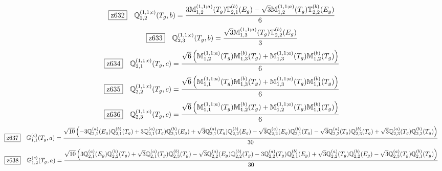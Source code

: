 \documentclass[fleqn,10pt,landscape]{jsarticle}
\begin{document}
\begin{dmath*}
\hspace*{3mm}\fbox{z632}\quad \mathbb{Q}_{2,2}^{(1,1;c)}(T_{g},b)=\frac{3 \mathbb{M}_{1,2}^{(1,1;a)}(T_{g}) \mathbb{T}_{2,1}^{(b)}(E_{g}) - \sqrt{3} \mathbb{M}_{1,2}^{(1,1;a)}(T_{g}) \mathbb{T}_{2,2}^{(b)}(E_{g})}{6}
\end{dmath*}
\begin{dmath*}
\hspace*{3mm}\fbox{z633}\quad \mathbb{Q}_{2,3}^{(1,1;c)}(T_{g},b)=\frac{\sqrt{3} \mathbb{M}_{1,3}^{(1,1;a)}(T_{g}) \mathbb{T}_{2,2}^{(b)}(E_{g})}{3}
\end{dmath*}
\begin{dmath*}
\hspace*{3mm}\fbox{z634}\quad \mathbb{Q}_{2,1}^{(1,1;c)}(T_{g},c)=\frac{\sqrt{6} \left(\mathbb{M}_{1,2}^{(1,1;a)}(T_{g}) \mathbb{M}_{1,3}^{(b)}(T_{g}) + \mathbb{M}_{1,3}^{(1,1;a)}(T_{g}) \mathbb{M}_{1,2}^{(b)}(T_{g})\right)}{6}
\end{dmath*}
\begin{dmath*}
\hspace*{3mm}\fbox{z635}\quad \mathbb{Q}_{2,2}^{(1,1;c)}(T_{g},c)=\frac{\sqrt{6} \left(\mathbb{M}_{1,1}^{(1,1;a)}(T_{g}) \mathbb{M}_{1,3}^{(b)}(T_{g}) + \mathbb{M}_{1,3}^{(1,1;a)}(T_{g}) \mathbb{M}_{1,1}^{(b)}(T_{g})\right)}{6}
\end{dmath*}
\begin{dmath*}
\hspace*{3mm}\fbox{z636}\quad \mathbb{Q}_{2,3}^{(1,1;c)}(T_{g},c)=\frac{\sqrt{6} \left(\mathbb{M}_{1,1}^{(1,1;a)}(T_{g}) \mathbb{M}_{1,2}^{(b)}(T_{g}) + \mathbb{M}_{1,2}^{(1,1;a)}(T_{g}) \mathbb{M}_{1,1}^{(b)}(T_{g})\right)}{6}
\end{dmath*}
\begin{dmath*}
\hspace*{3mm}\fbox{z637}\quad \mathbb{G}_{1,1}^{(c)}(T_{g},a)=\frac{\sqrt{10} \left(- 3 \mathbb{Q}_{2,1}^{(a)}(E_{g}) \mathbb{Q}_{2,1}^{(b)}(T_{g}) + 3 \mathbb{Q}_{2,1}^{(a)}(T_{g}) \mathbb{Q}_{2,1}^{(b)}(E_{g}) + \sqrt{3} \mathbb{Q}_{2,1}^{(a)}(T_{g}) \mathbb{Q}_{2,2}^{(b)}(E_{g}) - \sqrt{3} \mathbb{Q}_{2,2}^{(a)}(E_{g}) \mathbb{Q}_{2,1}^{(b)}(T_{g}) - \sqrt{3} \mathbb{Q}_{2,2}^{(a)}(T_{g}) \mathbb{Q}_{2,3}^{(b)}(T_{g}) + \sqrt{3} \mathbb{Q}_{2,3}^{(a)}(T_{g}) \mathbb{Q}_{2,2}^{(b)}(T_{g})\right)}{30}
\end{dmath*}
\begin{dmath*}
\hspace*{3mm}\fbox{z638}\quad \mathbb{G}_{1,2}^{(c)}(T_{g},a)=\frac{\sqrt{10} \left(3 \mathbb{Q}_{2,1}^{(a)}(E_{g}) \mathbb{Q}_{2,2}^{(b)}(T_{g}) + \sqrt{3} \mathbb{Q}_{2,1}^{(a)}(T_{g}) \mathbb{Q}_{2,3}^{(b)}(T_{g}) - \sqrt{3} \mathbb{Q}_{2,2}^{(a)}(E_{g}) \mathbb{Q}_{2,2}^{(b)}(T_{g}) - 3 \mathbb{Q}_{2,2}^{(a)}(T_{g}) \mathbb{Q}_{2,1}^{(b)}(E_{g}) + \sqrt{3} \mathbb{Q}_{2,2}^{(a)}(T_{g}) \mathbb{Q}_{2,2}^{(b)}(E_{g}) - \sqrt{3} \mathbb{Q}_{2,3}^{(a)}(T_{g}) \mathbb{Q}_{2,1}^{(b)}(T_{g})\right)}{30}
\end{dmath*}
\end{document}
